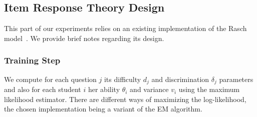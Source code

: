 \documentclass{edm_template}
\begin{document}
%


\subsection{Item Response Theory Design}

This part of our experiments relies on an existing implementation of the Rasch model~\cite{Rizopoulos2006}. We provide brief notes regarding its design.

\subsubsection{Training Step}

We compute for each question $j$ its difficulty $d_j$ and discrimination $\delta_j$ parameters and also for each student $i$ her ability $\theta_i$ and variance $v_i$ using the maximum likelihood estimator. There are different ways of maximizing the log-likelihood, the chosen implementation being a variant of the EM algorithm. %
\end{document}
